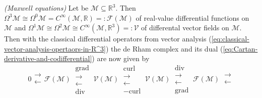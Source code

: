 \begin{beispiel}
	\label{bsp:Maxwell-equations}
	\emph{(Maxwell equations)}
	\cite[238]{Jaenich-1992}
	Let be $\mathscr{M} \subseteq \mathbb{R}^3$.
	Then $\Omega^3 \mathscr{M} \cong \Omega^0 \mathscr{M} = C^\infty(\mathscr{M}, \mathbb{R}) =: \mathscr{F}(\mathscr{M})$ of real-value differential functions on $\mathscr{M}$ and 
	$\Omega^1 \mathscr{M} \cong \Omega^2 \mathscr{M} \cong C^\infty(\mathscr{M}, \mathbb{R}^3) =: \mathscr{V}$
	of differental vector fields on $\mathscr{M}$.
	Then with the classical differential operators from vector analysis (\ref{eq:classical-vector-analysis-opertaors-in-R^3})
	the de Rham complex and its dual (\ref{eq:Cartan-derivative-and-codifferential}) 
	are now given by
	\begin{equation}
		0
		\begin{array}{c}
			\longrightarrow \\ [-1.9ex]
			\longleftarrow  \\
		\end{array}
		\mathscr{F}(\mathscr{M}) %
		\
		\begin{array}{c}
			{\scriptstyle \mathrm{grad}} \\ [-1.25ex] 
		\longrightarrow \\ [-1.9ex]
			\longleftarrow  \\ [-1.25ex] 
			{\scriptstyle \mathrm{div}}
		\end{array}
		\
		\mathscr{V}(\mathscr{M}) %
		\
		\begin{array}{c}
			{\scriptstyle \mathrm{curl}} \\ [-1.25ex] 
		\longrightarrow \\ [-1.9ex]
			\longleftarrow  \\ [-1.25ex] 
			{\scriptstyle -\mathrm{curl}}
		\end{array}
		\
		\mathscr{V}(\mathscr{M}) %
		\
		\begin{array}{c}
			{\scriptstyle \mathrm{div}} \\ [-1.25ex] 
		\longrightarrow \\ [-1.9ex]
			\longleftarrow  \\ [-1.25ex] 
			{\scriptstyle \mathrm{grad}}
		\end{array}
		\
		\mathscr{F}(\mathscr{M}) %
		\
		\begin{array}{c}
		\longrightarrow \\ [-1.9ex]
			\longleftarrow  \\

\end{array}
\end{equation}
\end{beispiel}
